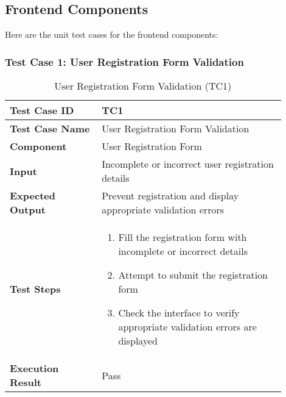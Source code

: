 \subsection{Frontend Components}

Here are the unit test cases for the frontend components:


\begin{table}[h]
	\subsubsection{Test Case 1: User Registration Form Validation}
	\centering
	\caption{User Registration Form Validation (TC1)}
	\begin{tabular}{|p{0.3\linewidth}|p{0.6\linewidth}|}
		\hline
		\textbf{Test Case ID} & TC1 \\
		\hline
		\textbf{Test Case Name} & User Registration Form Validation \\
		\hline
		\textbf{Component} & User Registration Form \\
		\hline
		\textbf{Input} & Incomplete or incorrect user registration details \\
		\hline
		\textbf{Expected Output} & Prevent registration and display appropriate validation errors \\
		\hline
		\textbf{Test Steps} & 
		\begin{enumerate}
			\item Fill the registration form with incomplete or incorrect details
			\item Attempt to submit the registration form
			\item Check the interface to verify appropriate validation errors are displayed
		\end{enumerate} \\
		\hline
		\textbf{Execution Result} & Pass \\
		\hline
	\end{tabular}
\end{table}

